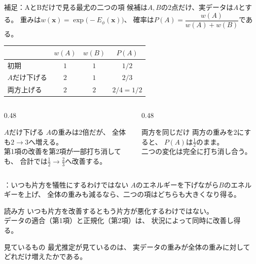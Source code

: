 \begin{frame}{補足：AとBだけで見る最尤の二つの項}
    候補は$A,B$の2点だけ、実データは$A$とする。
    重みは$w(\bm{x})=\exp\!\bigl(-E_\phi(\bm{x})\bigr)$、
    確率は$P(A)=\dfrac{w(A)}{w(A)+w(B)}$である。
    \vspace{0.35em}
    \centering
    \renewcommand{\arraystretch}{1.55}
    \begin{tabular}{lccc}
        \hline
        & $w(A)$ & $w(B)$ & $P(A)$ \\
        \hline
        初期 & $1$ & $1$ & $1/2$ \\
        $A$だけ下げる & $2$ & $1$ & $2/3$ \\
        両方上げる & $2$ & $2$ & $2/4=1/2$ \\
        \hline
    \end{tabular}
    \vspace{0.45em}
    \begin{columns}[T,onlytextwidth]
        \begin{column}{0.48\textwidth}
            \begin{exampleblock}{$A$だけ下げる}
                $A$の重みは2倍だが、
                全体も$2\to 3$へ増える。\\
                第1項の改善を第2項が一部打ち消しても、
                合計では$\frac12\to\frac23$へ改善する。
            \end{exampleblock}
        \end{column}
        \begin{column}{0.48\textwidth}
            \begin{exampleblock}{両方を同じだけ}
                両方の重みを$2$にすると、
                $P(A)$は$\frac12$のまま。\\
                二つの変化は完全に打ち消し合う。
            \end{exampleblock}
        \end{column}
    \end{columns}
\end{frame}
\assuppl
\begin{frame}{\supplmark：いつも片方を犠牲にするわけではない}
    $A$のエネルギーを下げながら$B$のエネルギーを上げ、
    全体の重みも減るなら、二つの項はどちらも大きくなり得る。
    \begin{exampleblock}{読み方}
        いつも片方を改善するともう片方が悪化するわけではない。\\
        データの適合（第1項）と正規化（第2項）は、
        状況によって同時に改善し得る。
    \end{exampleblock}
    \begin{exampleblock}{見ているもの}
        最尤推定が見ているのは、
        実データの重みが全体の重みに対してどれだけ増えたかである。
    \end{exampleblock}
\end{frame}
